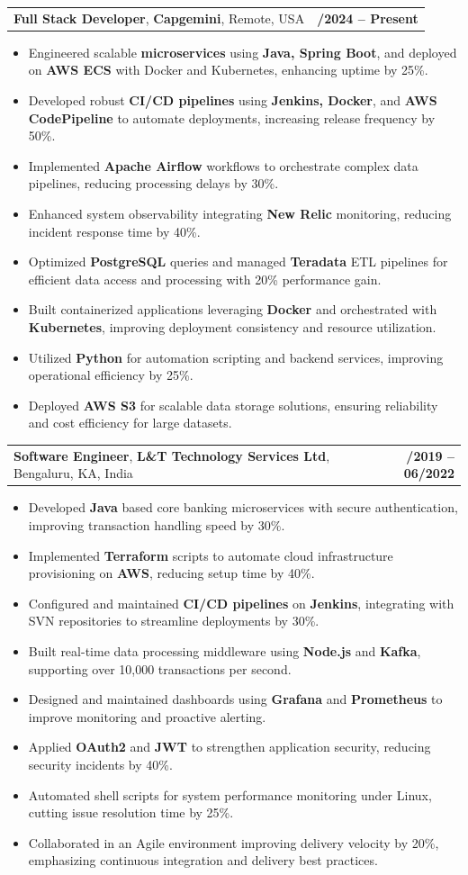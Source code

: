 \documentclass[letterpaper,11pt]{article}
\makeatletter
\newcommand{\resumeItem}[1]{
  \item\footnotesize{
    {#1 \vspace{-2pt}}
  }
}
\newcommand{\resumeSubheading}[4]{
  \vspace{-2pt}\item
    \begin{tabular*}{1.0\textwidth}[t]{l@{\extracolsep{\fill}}r}
      \textbf{\fontsize{10pt}{14pt}\selectfont #3}, \textbf{\fontsize{10pt}{14pt}\selectfont #1}, \fontsize{10pt}{14pt}\selectfont #4 & \textbf{\fontsize{10pt}{14pt}\selectfont #2} \\
    \end{tabular*}\vspace{-7pt}
}
\newcommand{\resumeItemListStart}{\begin{itemize}[leftmargin=*]}
\newcommand{\resumeItemListEnd}{\end{itemize}\vspace{-5pt}}
\makeatother
\begin{document}
    \resumeSubheading
        {Capgemini}{01/2024 -- Present}
        {Full Stack Developer}{Remote, USA}
      \resumeItemListStart
        \resumeItem{Engineered scalable \textbf{microservices} using \textbf{Java, Spring Boot}, and deployed on \textbf{AWS ECS} with Docker and Kubernetes, enhancing uptime by 25\%.}
        \resumeItem{Developed robust \textbf{CI/CD pipelines} using \textbf{Jenkins, Docker}, and \textbf{AWS CodePipeline} to automate deployments, increasing release frequency by 50\%.}
        \resumeItem{Implemented \textbf{Apache Airflow} workflows to orchestrate complex data pipelines, reducing processing delays by 30\%.}
        \resumeItem{Enhanced system observability integrating \textbf{New Relic} monitoring, reducing incident response time by 40\%.}
        \resumeItem{Optimized \textbf{PostgreSQL} queries and managed \textbf{Teradata} ETL pipelines for efficient data access and processing with 20\% performance gain.}
        \resumeItem{Built containerized applications leveraging \textbf{Docker} and orchestrated with \textbf{Kubernetes}, improving deployment consistency and resource utilization.}
        \resumeItem{Utilized \textbf{Python} for automation scripting and backend services, improving operational efficiency by 25\%.}
        \resumeItem{Deployed \textbf{AWS S3} for scalable data storage solutions, ensuring reliability and cost efficiency for large datasets.}
      \resumeItemListEnd

    \resumeSubheading
        {L\&T Technology Services Ltd}{08/2019 -- 06/2022}
        {Software Engineer}{Bengaluru, KA, India}
      \resumeItemListStart
        \resumeItem{Developed \textbf{Java} based core banking microservices with secure authentication, improving transaction handling speed by 30\%.}
        \resumeItem{Implemented \textbf{Terraform} scripts to automate cloud infrastructure provisioning on \textbf{AWS}, reducing setup time by 40\%.}
        \resumeItem{Configured and maintained \textbf{CI/CD pipelines} on \textbf{Jenkins}, integrating with SVN repositories to streamline deployments by 30\%.}
        \resumeItem{Built real-time data processing middleware using \textbf{Node.js} and \textbf{Kafka}, supporting over 10,000 transactions per second.}
        \resumeItem{Designed and maintained dashboards using \textbf{Grafana} and \textbf{Prometheus} to improve monitoring and proactive alerting.}
        \resumeItem{Applied \textbf{OAuth2} and \textbf{JWT} to strengthen application security, reducing security incidents by 40\%.}
        \resumeItem{Automated shell scripts for system performance monitoring under Linux, cutting issue resolution time by 25\%.}
        \resumeItem{Collaborated in an Agile environment improving delivery velocity by 20\%, emphasizing continuous integration and delivery best practices.}
      \resumeItemListEnd
\end{document}
